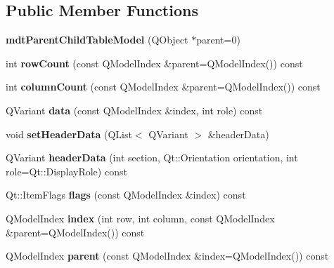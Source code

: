 \subsection*{Public Member Functions}
\begin{DoxyCompactItemize}
\item 
\hypertarget{classmdt_parent_child_table_model_a6a02b85f8663bd913b23380381287c0b}{
{\bfseries mdtParentChildTableModel} (QObject $\ast$parent=0)}
\label{classmdt_parent_child_table_model_a6a02b85f8663bd913b23380381287c0b}

\item 
\hypertarget{classmdt_parent_child_table_model_a00ede0aa95a181c04aafffa56bd8f470}{
int {\bfseries rowCount} (const QModelIndex \&parent=QModelIndex()) const }
\label{classmdt_parent_child_table_model_a00ede0aa95a181c04aafffa56bd8f470}

\item 
\hypertarget{classmdt_parent_child_table_model_a6d1941603fde6be4942439f22616249e}{
int {\bfseries columnCount} (const QModelIndex \&parent=QModelIndex()) const }
\label{classmdt_parent_child_table_model_a6d1941603fde6be4942439f22616249e}

\item 
\hypertarget{classmdt_parent_child_table_model_aea9349919cafde88c33aa6ff8c68f4ff}{
QVariant {\bfseries data} (const QModelIndex \&index, int role) const }
\label{classmdt_parent_child_table_model_aea9349919cafde88c33aa6ff8c68f4ff}

\item 
\hypertarget{classmdt_parent_child_table_model_a639b9f817d3c67e913c1e758ceb15f12}{
void {\bfseries setHeaderData} (QList$<$ QVariant $>$ \&headerData)}
\label{classmdt_parent_child_table_model_a639b9f817d3c67e913c1e758ceb15f12}

\item 
\hypertarget{classmdt_parent_child_table_model_ac0fe230365b4685729886eb89c3bee2d}{
QVariant {\bfseries headerData} (int section, Qt::Orientation orientation, int role=Qt::DisplayRole) const }
\label{classmdt_parent_child_table_model_ac0fe230365b4685729886eb89c3bee2d}

\item 
\hypertarget{classmdt_parent_child_table_model_ad937c815fb4d3afdd7bf6a222e216b2c}{
Qt::ItemFlags {\bfseries flags} (const QModelIndex \&index) const }
\label{classmdt_parent_child_table_model_ad937c815fb4d3afdd7bf6a222e216b2c}

\item 
\hypertarget{classmdt_parent_child_table_model_abd2bd46910ca92c7b92ff24593bfa4d1}{
QModelIndex {\bfseries index} (int row, int column, const QModelIndex \&parent=QModelIndex()) const }
\label{classmdt_parent_child_table_model_abd2bd46910ca92c7b92ff24593bfa4d1}

\item 
\hypertarget{classmdt_parent_child_table_model_aa4827005e9009f1b0fddf4ae962d6031}{
QModelIndex {\bfseries parent} (const QModelIndex \&index=QModelIndex()) const }
\label{classmdt_parent_child_table_model_aa4827005e9009f1b0fddf4ae962d6031}

\end{DoxyCompactItemize}


